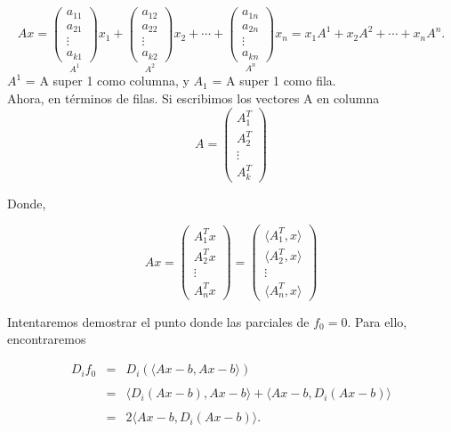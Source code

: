 $$
Ax = 
\underset{A^1}{
\begin{pmatrix}
    a_{11}\\
    a_{21}\\
    \vdots\\
    a_{k1}
\end{pmatrix}}
x_1+
\underset{A^2}{
\begin{pmatrix}
	a_{12}\\
	a_{22}\\
	\vdots\\
	a_{k2}
\end{pmatrix}}
x_2+
\cdots +
\underset{A^n}{
\begin{pmatrix}
	a_{1n}\\
	a_{2n}\\
	\vdots\\
	a_{kn}
\end{pmatrix}}
x_n
=
x_1A^1+x_2A^2+\cdots+x_nA^n.
$$
$A^1$ = A super 1 como columna, y $A_1$ = A super 1 como fila.\\

Ahora, en términos de filas. Si escribimos los vectores A en columna
$$
A = 
\begin{pmatrix}
	A^T_1\\
	A^T_2\\
	\vdots\\
	A^T_k
\end{pmatrix}
$$

Donde,

$$
Ax = 
\begin{pmatrix}
	A^T_1x\\
	A^T_2x\\
	\vdots\\
	A^T_nx
\end{pmatrix}
=
\begin{pmatrix}
	\langle A^T_1,x\rangle\\
	\langle A^T_2,x\rangle\\
	\vdots\\
	\langle A^T_n,x\rangle
\end{pmatrix}
$$


Intentaremos demostrar el punto donde las parciales de $f_0=0$. Para ello, encontraremos 

$$
\begin{array}{rcl}
    D_if_0&=&D_i\left(\langle Ax-b, Ax-b\rangle\right)\\\\
	  &=&\langle D_i\left(Ax-b\right),Ax-b\rangle+\langle Ax-b,D_i\left(Ax-b\right)\rangle\\\\
	  &=& 2\langle Ax-b,D_i\left(Ax-b\right)\rangle.
\end{array}
$$

